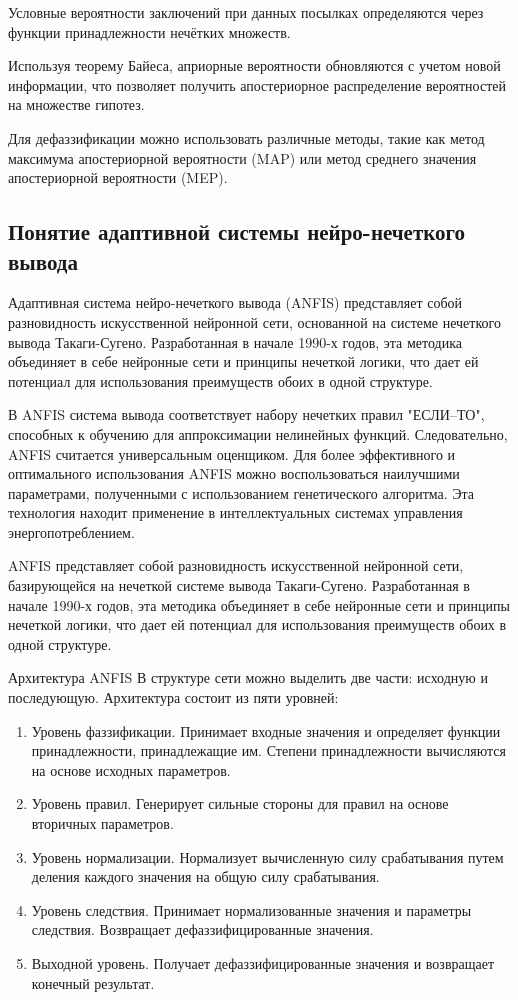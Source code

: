 Условные вероятности заключений при данных посылках определяются через функции принадлежности нечётких множеств.

Используя теорему Байеса, априорные вероятности обновляются с учетом новой информации, что позволяет получить апостериорное распределение вероятностей на множестве гипотез.

Для дефаззификации можно использовать различные методы, такие как метод максимума апостериорной вероятности (MAP) или метод среднего значения апостериорной вероятности (MEP).

\subsection{Понятие адаптивной системы нейро-нечеткого вывода}
Адаптивная система нейро-нечеткого вывода (ANFIS) представляет собой разновидность искусственной нейронной сети, основанной на системе нечеткого вывода Такаги-Сугено. Разработанная в начале 1990-х годов, эта методика объединяет в себе нейронные сети и принципы нечеткой логики, что дает ей потенциал для использования преимуществ обоих в одной структуре.

В ANFIS система вывода соответствует набору нечетких правил "ЕСЛИ–ТО", способных к обучению для аппроксимации нелинейных функций. Следовательно, ANFIS считается универсальным оценщиком. Для более эффективного и оптимального использования ANFIS можно воспользоваться наилучшими параметрами, полученными с использованием генетического алгоритма. Эта технология находит применение в интеллектуальных системах управления энергопотреблением.

ANFIS представляет собой разновидность искусственной нейронной сети, базирующейся на нечеткой системе вывода Такаги-Сугено. Разработанная в начале 1990-х годов, эта методика объединяет в себе нейронные сети и принципы нечеткой логики, что дает ей потенциал для использования преимуществ обоих в одной структуре.

Архитектура ANFIS
В структуре сети можно выделить две части: исходную и последующую. Архитектура состоит из пяти уровней:
\begin{enumerate}
\item Уровень фаззификации. Принимает входные значения и определяет функции принадлежности, принадлежащие им. Степени принадлежности вычисляются на основе исходных параметров.
\item Уровень правил. Генерирует сильные стороны для правил на основе вторичных параметров.
\item Уровень нормализации. Нормализует вычисленную силу срабатывания путем деления каждого значения на общую силу срабатывания.
\item Уровень следствия. Принимает нормализованные значения и параметры следствия. Возвращает дефаззифицированные значения.
\item Выходной уровень. Получает дефаззифицированные значения и возвращает конечный результат.
\end{enumerate}

